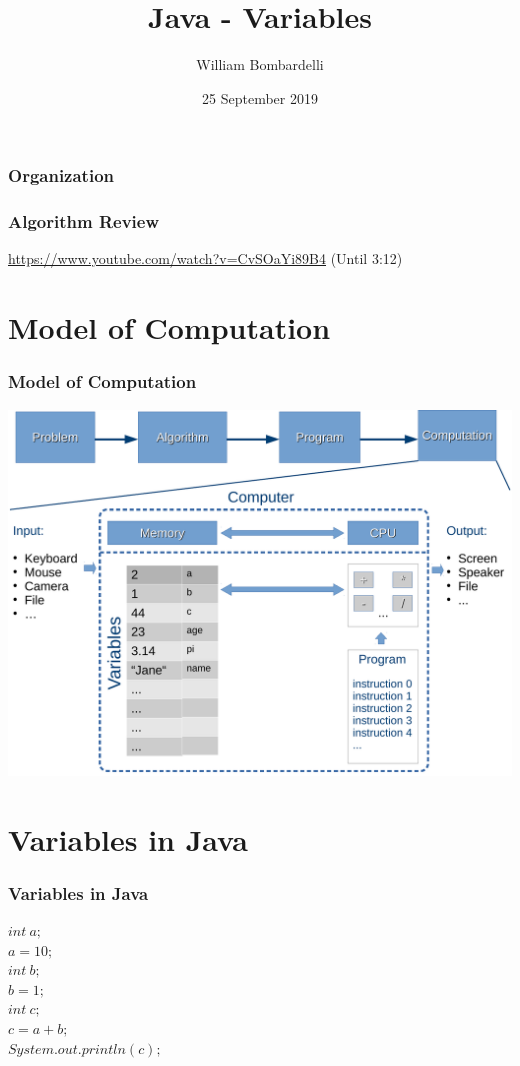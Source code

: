 \documentclass{beamer}
\title[Java]{Java - Variables}
\author[W. Bombardelli]{William Bombardelli}
\institute[Schweizerschule Mexiko]
{
	\vskip 12pt
	Schweizerschule Mexiko, Ciudad de México, Mexico \\
	\texttt{\url{https://github.com/wbombardellis/java-unterricht}}
}
\date{25 September 2019}
\begin{document}
	\begin{frame}
		\titlepage
	\end{frame}
	
	\begin{frame}
		\frametitle{Organization}
		\tableofcontents
	\end{frame}

	\begin{frame}
		\frametitle{Algorithm Review}
		\url{https://www.youtube.com/watch?v=CvSOaYi89B4} (Until 3:12)
	\end{frame}
	
	\section{Model of Computation}
	\begin{frame}
		\frametitle{Model of Computation}
		\centering
		\vspace{-4px}
		\includegraphics[width=.9\textwidth]{Memory-CPU-Scheme}
	\end{frame}

	\section{Variables in Java}

	\begin{frame}
		\frametitle{Variables in Java}
		$int\ a;$\\
		$a = 10;$\\
		$int\ b;$\\
		$b = 1;$\\
		$int\ c;$\\
		$c = a + b;$\\
		$System.out.println(c);$
	\end{frame}
\end{document}
